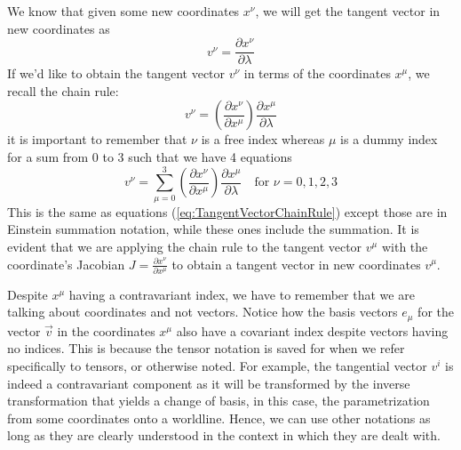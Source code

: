 \documentclass{article}
\begin{document}
\begin{exmp}
	 		\vspace{-1cm}
	 		\noindent
	 		We know that given some new coordinates $x^{\nu}$, we will get the tangent vector in new coordinates as
	 		$$ v^{\nu} =  \frac{\partial x^{\nu}}{\partial \lambda}$$
	 		If we'd like to obtain the tangent vector $v^{\nu}$ in terms of the coordinates $x^\mu$, we recall the chain rule:
	 		\begin{equation}
	 			\label{eq:TangentVectorChainRule}
	 			\boxed{v^{\nu} = \left(\frac{\partial x^{\nu}}{\partial x^\mu}\right)\frac{\partial x^\mu}{\partial \lambda}}
	 		\end{equation}
	 		it is important to remember that $\nu$ is a free index whereas $\mu$ is a dummy index for a sum from 0 to 3 such that we have 4 equations
	 		$$ v^{\nu} = \sum_{\mu=0}^3 \left(\frac{\partial x^{\nu}}{\partial x^\mu}\right)\frac{\partial x^\mu}{\partial \lambda} \quad \text{for } \nu = 0,1,2,3 $$
	 		This is the same as equations (\ref{eq:TangentVectorChainRule}) except those are in Einstein summation notation, while these ones include the summation. It is evident that we are applying the chain rule to the tangent vector $v^\mu$ with the coordinate's Jacobian $J=\frac{\partial x^{\nu}}{\partial x^\mu}$ to obtain a tangent vector in new coordinates $v^\mu$.
 		\end{exmp}
 		\begin{note}
 			Despite $x^\mu$ having a contravariant index, we have to remember that we are talking about coordinates and not vectors. Notice how the basis vectors $e_\mu$ for the vector $\vec{v}$ in the coordinates $x^\mu$ also have a covariant index despite vectors having no indices. This is because the tensor notation is saved for when we refer specifically to tensors, or otherwise noted. For example, the tangential vector $v^i$ is indeed a contravariant component as it will be transformed by the inverse transformation that yields a change of basis, in this case, the parametrization from some coordinates onto a worldline. Hence, we can use other notations as long as they are clearly understood in the context in which they are dealt with. 
 		\end{note}
 	
\end{document}
